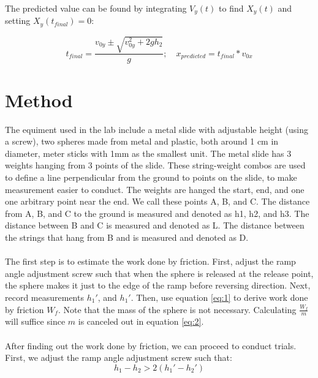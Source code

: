 \documentclass{article}
\begin{document}
The predicted value can be found by integrating $V_{y}(t)$ to find $X_{y}(t)$ and setting $X_{y}(t_{final}) = 0$:


\begin{equation}
    t_{final} = \frac{v_{0y} \pm \sqrt{v_{0y}^2 + 2gh_{2}}}{g}; \quad x_{predicted} = t_{final} * v_{0x}
\end{equation}


\clearpage
\section{Method}

The equiment used in the lab include a metal slide with adjustable height (using a screw), two spheres made from metal and plastic, both around 1 \si{cm} in diameter, meter sticks with 1\si{mm} as the smallest unit. The metal slide has 3 weights hanging from 3 points of the slide. These string-weight combos are used to define a line perpendicular from the ground to points on the slide, to make measurement easier to conduct. The weights are hanged the start, end, and one one arbitrary point near the end. We call these points A, B, and C. The distance from A, B, and C to the ground is measured and denoted as h1, h2, and h3. The distance between B and C is measured and denoted as L. The distance between the strings that hang from B and is measured and denoted as D.\\\\
The first step is to estimate the work done by friction. First, adjust the ramp angle adjustment screw such that when the sphere is released at the release point, the sphere makes it just to the edge of the ramp before reversing direction. Next, record measurements $h_{1}\ensuremath{'}$, and $h_{1}\ensuremath{'}$. Then, use equation \eqref{eq:1} to derive work done by friction $W_{f}$. Note that the mass of the sphere is not necessary. Calculating $\frac{W_{f}}{m}$ will suffice since $m$ is canceled out in equation \eqref{eq:2}.\\\\
After finding out the work done by friction, we can proceed to conduct trials. First, we adjust the ramp angle adjustment screw such that:
                \begin{equation} h_{1} - h_{2} > 2(h_{1}\ensuremath{'} - h_{2}\ensuremath{'}) \end{equation}
\end{document}
